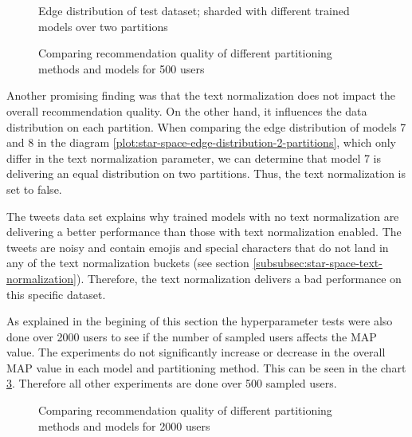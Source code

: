\begin{figure}[!htb]
    \centering
    
    \caption{Edge distribution of test dataset; sharded with different trained models over two partitions}
    \label{plot:edge-distribution}
\end{figure}

\begin{figure}[!htb]
    \centering
    
    \caption{Comparing recommendation quality of different partitioning methods and models for 500 users}
    \label{plot:hyperparameter-recommendation-quality}
\end{figure}


Another promising finding was that the text normalization does not impact the overall recommendation quality. On the other hand, it influences the data distribution on each partition. When comparing the edge distribution of models 7 and 8 in the diagram \ref{plot:star-space-edge-distribution-2-partitions}, which only differ in the text normalization parameter, we can determine that model 7 is delivering an equal distribution on two partitions. Thus, the text normalization is set to false. 


The tweets data set explains why trained models with no text normalization are delivering a better performance than those with text normalization enabled. The tweets are noisy and contain emojis and special characters that do not land in any of the text normalization buckets (see section \ref{subsubsec:star-space-text-normalization}). Therefore, the text normalization delivers a bad performance on this specific dataset.


As explained in the begining of this section the hyperparameter tests were also done over 2000 users to see if the number of sampled users affects the MAP value. The experiments do not significantly increase or decrease in the overall MAP value in each model and partitioning method. This can be seen in the chart \ref{plot:hyperparameter-recommendation-quality-2000-users}. Therefore all other experiments are done over 500 sampled users.

\begin{figure}[!htb]
    \centering
    
    \caption{Comparing recommendation quality of different partitioning methods and models for 2000 users}
    \label{plot:hyperparameter-recommendation-quality-2000-users}
\end{figure}


